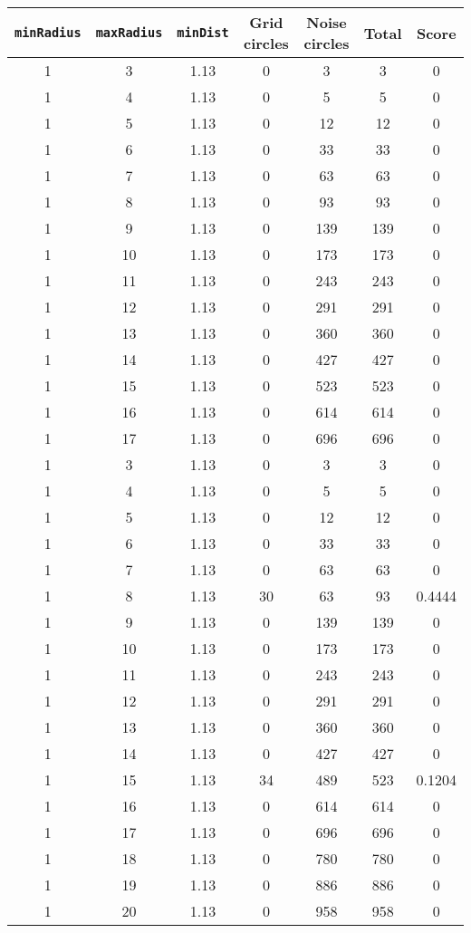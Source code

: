 \documentclass[letterpaper, 12pt]{article}
\begin{document}
\begin{longtable}{|c|c|c|c|c|c|c|}
\hline
\textbf{\texttt{minRadius}} & \textbf{\texttt{maxRadius}} & \textbf{\texttt{minDist}} & \textbf{Grid circles} & \textbf{Noise circles} & \textbf{Total} & \textbf{Score} \\
\hline
1 & 3 & 1.13 & 0 & 3 & 3 & 0 \\
\hline
1 & 4 & 1.13 & 0 & 5 & 5 & 0 \\
\hline
1 & 5 & 1.13 & 0 & 12 & 12 & 0 \\
\hline
1 & 6 & 1.13 & 0 & 33 & 33 & 0 \\
\hline
1 & 7 & 1.13 & 0 & 63 & 63 & 0 \\
\hline
1 & 8 & 1.13 & 0 & 93 & 93 & 0 \\
\hline
1 & 9 & 1.13 & 0 & 139 & 139 & 0 \\
\hline
1 & 10 & 1.13 & 0 & 173 & 173 & 0 \\
\hline
1 & 11 & 1.13 & 0 & 243 & 243 & 0 \\
\hline
1 & 12 & 1.13 & 0 & 291 & 291 & 0 \\
\hline
1 & 13 & 1.13 & 0 & 360 & 360 & 0 \\
\hline
1 & 14 & 1.13 & 0 & 427 & 427 & 0 \\
\hline
1 & 15 & 1.13 & 0 & 523 & 523 & 0 \\
\hline
1 & 16 & 1.13 & 0 & 614 & 614 & 0 \\
\hline
1 & 17 & 1.13 & 0 & 696 & 696 & 0 \\
\hline
1 & 3 & 1.13 & 0 & 3 & 3 & 0 \\
\hline
1 & 4 & 1.13 & 0 & 5 & 5 & 0 \\
\hline
1 & 5 & 1.13 & 0 & 12 & 12 & 0 \\
\hline
1 & 6 & 1.13 & 0 & 33 & 33 & 0 \\
\hline
1 & 7 & 1.13 & 0 & 63 & 63 & 0 \\
\hline
1 & 8 & 1.13 & 30 & 63 & 93 & 0.4444 \\
\hline
1 & 9 & 1.13 & 0 & 139 & 139 & 0 \\
\hline
1 & 10 & 1.13 & 0 & 173 & 173 & 0 \\
\hline
1 & 11 & 1.13 & 0 & 243 & 243 & 0 \\
\hline
1 & 12 & 1.13 & 0 & 291 & 291 & 0 \\
\hline
1 & 13 & 1.13 & 0 & 360 & 360 & 0 \\
\hline
1 & 14 & 1.13 & 0 & 427 & 427 & 0 \\
\hline
1 & 15 & 1.13 & 34 & 489 & 523 & 0.1204 \\
\hline
1 & 16 & 1.13 & 0 & 614 & 614 & 0 \\
\hline
1 & 17 & 1.13 & 0 & 696 & 696 & 0 \\
\hline
1 & 18 & 1.13 & 0 & 780 & 780 & 0 \\
\hline
1 & 19 & 1.13 & 0 & 886 & 886 & 0 \\
\hline
1 & 20 & 1.13 & 0 & 958 & 958 & 0 \\
\hline
\end{longtable}
\end{document}
